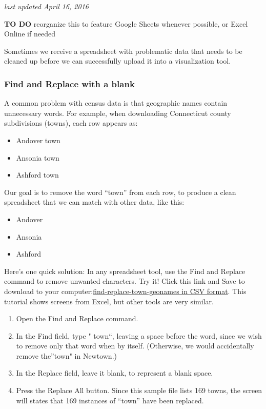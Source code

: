 \documentclass[
  english,
]{book}
\providecommand{\tightlist}{%
  \setlength{\itemsep}{0pt}\setlength{\parskip}{0pt}}
\begin{document}
\emph{last updated April 16, 2016}

\textbf{TO DO} reorganize this to feature Google Sheets whenever possible, or Excel Online if needed

Sometimes we receive a spreadsheet with problematic data that needs to be cleaned up before we can successfully upload it into a visualization tool.

\hypertarget{find-and-replace-with-a-blank}{%
\subsubsection*{Find and Replace with a blank}\label{find-and-replace-with-a-blank}}

A common problem with census data is that geographic names contain unnecessary words. For example, when downloading Connecticut county subdivisions (towns), each row appears as:

\begin{itemize}
\tightlist
\item
  Andover town
\item
  Ansonia town
\item
  Ashford town
\end{itemize}

Our goal is to remove the word ``town'' from each row, to produce a clean spreadsheet that we can match with other data, like this:

\begin{itemize}
\tightlist
\item
  Andover
\item
  Ansonia
\item
  Ashford
\end{itemize}

Here's one quick solution: In any spreadsheet tool, use the Find and Replace command to remove unwanted characters. Try it! Click this link and Save to download to your computer:\href{data/find-replace-town-geonames.csv}{find-replace-town-geonames in CSV format}. This tutorial shows screens from Excel, but other tools are very similar.

\begin{enumerate}
\def\labelenumi{\arabic{enumi}.}
\item
  Open the Find and Replace command.
\item
  In the Find field, type " town``, leaving a space before the word, since we wish to remove only that word when by itself. (Otherwise, we would accidentally remove the''town" in Newtown.)
\item
  In the Replace field, leave it blank, to represent a blank space.
\item
  Press the Replace All button. Since this sample file lists 169 towns, the screen will states that 169 instances of ``town'' have been replaced.
\end{enumerate}
\end{document}
